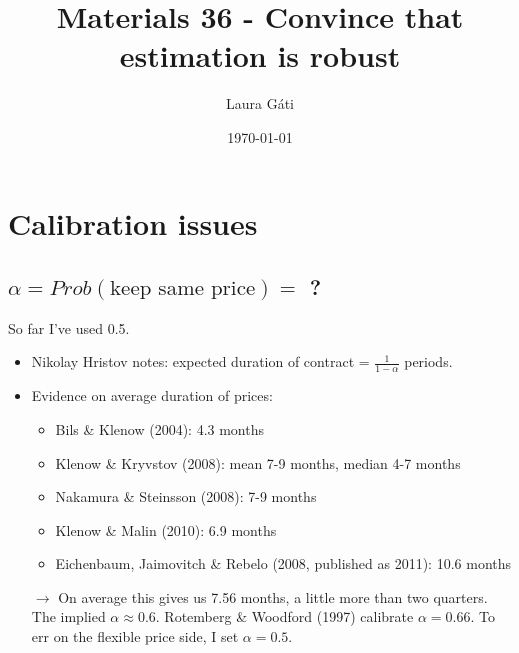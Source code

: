 \documentclass[11pt]{article}
\renewcommand{\[}{\begin{equation}}
\renewcommand{\]}{\end{equation}}
\begin{document}
\linespread{1.0}

\title{Materials 36 - Convince that estimation is robust}
\author{Laura G\'ati} 
\date{\today}
\maketitle


\tableofcontents


\newpage

\section{Calibration issues}
\subsection{$\alpha=Prob(\text{keep same price})=$ ?}
So far I've used 0.5.
\begin{itemize}
\item Nikolay Hristov notes: expected duration of contract = $\frac{1}{1-\alpha}$ periods.
\item Evidence on average duration of prices:
\begin{itemize}
\item Bils \& Klenow (2004): 4.3 months
\item Klenow \& Kryvstov (2008): mean 7-9 months, median 4-7 months
\item Nakamura \& Steinsson (2008): 7-9 months
\item Klenow \& Malin (2010): 6.9 months
\item Eichenbaum, Jaimovitch \& Rebelo (2008, published as 2011): 10.6 months
\end{itemize}
\item[$\rightarrow$] On average this gives us 7.56 months, a little more than two quarters. The implied $\alpha \approx 0.6$. Rotemberg \& Woodford (1997) calibrate $\alpha=0.66$. To err on the flexible price side, I set $\alpha =0.5$.
\end{itemize}
\end{document}
